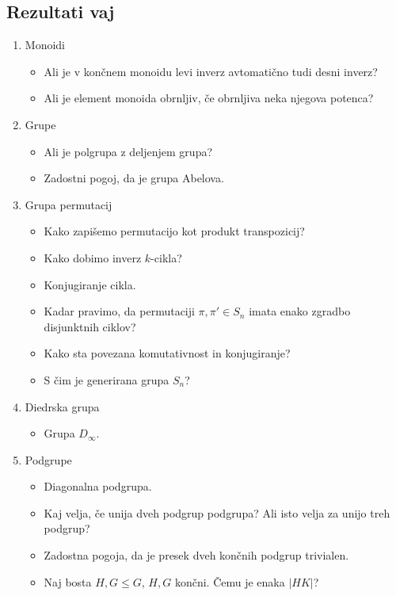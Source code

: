 \subsection*{Rezultati vaj}
\begin{enumerate}
    \item Monoidi     
    \begin{itemize}
        \item Ali je v končnem monoidu levi inverz avtomatično tudi desni inverz?
        \item Ali je element monoida obrnljiv, če obrnljiva neka njegova potenca?
    \end{itemize}

    \item Grupe
    \begin{itemize}
        \item Ali je polgrupa z deljenjem grupa?
        \item Zadostni pogoj, da je grupa Abelova.
    \end{itemize}
    \item Grupa permutacij
    \begin{itemize}
        \item Kako zapišemo permutacijo kot produkt transpozicij?
        \item Kako dobimo inverz $k$-cikla?
        \item Konjugiranje cikla.
        \item Kadar pravimo, da permutaciji $\pi, \pi' \in S_n$ imata enako zgradbo disjunktnih ciklov?
        \item Kako sta povezana komutativnost in konjugiranje?
        \item S čim je generirana grupa $S_n$?
    \end{itemize}

    \item Diedrska grupa
    \begin{itemize}
        \item Grupa $D_\infty$.
    \end{itemize}

    \item Podgrupe
    \begin{itemize}
        \item Diagonalna podgrupa.
        \item Kaj velja, če unija dveh podgrup podgrupa? Ali isto velja za unijo treh podgrup?
        \item Zadostna pogoja, da je presek dveh končnih podgrup trivialen.
        \item Naj bosta $H, G \leq G$, $H, G$ končni. Čemu je enaka $|HK|$?
    \end{itemize}


\end{enumerate}
